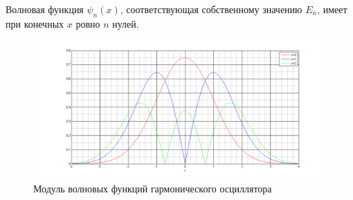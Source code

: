 \begin{thm}
Волновая функция $\psi_n(x)$, соответствующая собственному значению $E_n$, имеет при конечных $x$ ровно $n$ нулей.
\end{thm}

\begin{figure}[h]
  \centering
  \includegraphics[scale=0.3]{figs/7_2}
  \caption{Модуль волновых функций гармонического осциллятора}
  \label{fig:7_2}
\end{figure}